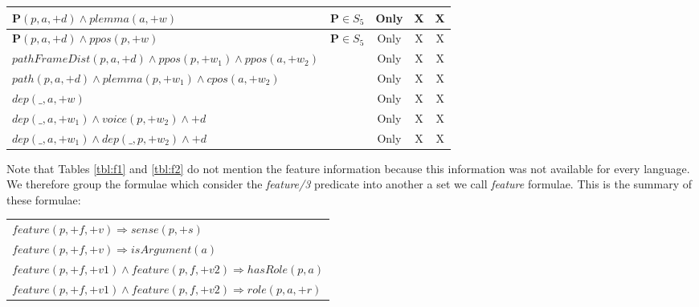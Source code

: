 \begin{table*}[th]
\begin{tabular}{|>{\small}p{10cm}|>{\small}c|>{\small}c|>{\small}c|>{\small}c|}
   $ \mathbf{P}(p,a,+d) \land plemma(a,+w) $ & $\mathbf{P} \in S_5$ & Only         & X & X \\\hline
   $ \mathbf{P}(p,a,+d) \land ppos(p,+w) $ & $\mathbf{P} \in S_5$   & Only        & X & X \\\hline
   $ pathFrameDist(p,a,+d) \land ppos(p,+w_1) \land ppos(a,+w_2) $ &  & Only           & X & X \\\hline
   $ path(p,a,+d) \land plemma(p,+w_1) \land cpos(a,+w_2) $ &  & Only          & X & X \\\hline
   $ dep(\_,a,+w)$  & & Only  & X & X \\\hline
   $ dep(\_,a,+w_1) \land voice(p,+w_2) \land +d$    &  & Only & X & X  \\\hline
   $ dep(\_,a,+w_1) \land dep(\_,p,+w_2) \land +d$    & & Only & X & X  \\\hline
\end{tabular}


\caption{Templates of the local formulae for \emph{hasRole/2} and 
\emph{role/3}. H: head of clause is $hasRole(p,a)$, R: head of clause is 
$role(p,a,+r)$ and $S_1 = \{ppos,plemma\}, S_2=\{frame, unlabelFrame, path\}, S_3= \{frame,pathFrame\},S_4=\{frame,pathFrame,path\}, S_5= \{pathFrameDist, path\} $}
\label{tbl:f2}
\end{table*}

Note that Tables \ref{tbl:f1} and \ref{tbl:f2} do not mention the feature information because 
this information was not available for every language. We therefore group the 
formulae which consider the \emph{feature/3} predicate into another a set we call 
\emph{feature} formulae. This is the summary of these formulae:
\begin{tabular}{p{7.0cm}}
   $ feature(p,+f,+v) \Rightarrow sense(p,+s)    $\\
   $ feature(p,+f,+v) \Rightarrow isArgument(a)    $\\
   $ feature(p,+f,+v1) \land feature(p,f,+v2) \Rightarrow hasRole(p,a)    $\\
   $ feature(p,+f,+v1) \land feature(p,f,+v2) \Rightarrow role(p,a,+r)   $\\
\end{tabular}


